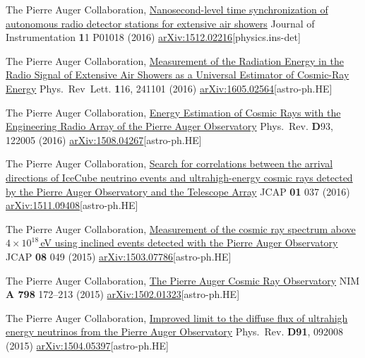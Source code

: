 \begin{etaremune}
\item {}The Pierre Auger Collaboration, \href{http://iopscience.iop.org/article/10.1088/1748-0221/11/01/P01018}{{Nanosecond-level time synchronization of autonomous radio detector stations for extensive air showers}} Journal of Instrumentation {\textbf 11} P01018 (2016) \href{http://arxiv.org/abs/1512.02216}{arXiv:1512.02216}[physics.ins-det]

\item {}The Pierre Auger Collaboration, \href{http://journals.aps.org/prl/abstract/10.1103/PhysRevLett.116.241101}{{Measurement of the Radiation Energy in the Radio Signal of Extensive Air Showers as a Universal Estimator of Cosmic-Ray Energy}} Phys.\ Rev\  Lett. {\textbf 116}, 241101 (2016) \href{http://arxiv.org/abs/1605.02564}{arXiv:1605.02564}[astro-ph.HE]

\item {}The Pierre Auger Collaboration, \href{http://journals.aps.org/prd/abstract/10.1103/PhysRevD.93.122005}{{Energy Estimation of Cosmic Rays with the Engineering Radio Array of the Pierre Auger Observatory}} Phys.\ Rev. {\textbf D93}, 122005 (2016) \href{http://arxiv.org/abs/1508.04267}{arXiv:1508.04267}[astro-ph.HE]

\item {}The Pierre Auger Collaboration, \href{http://dx.doi.org/10.1088/1475-7516/2016/01/037}{{Search for correlations between the arrival directions of IceCube neutrino events and ultrahigh-energy cosmic rays detected by the Pierre Auger Observatory and the Telescope Array}} JCAP {\textbf{01}} 037 (2016) \href{http://arxiv.org/abs/1511.09408}{arXiv:1511.09408}[astro-ph.HE]

\item {}The Pierre Auger Collaboration, \href{http://dx.doi.org/10.1088/1475-7516/2015/08/049}{{Measurement of the cosmic ray spectrum above $4\times 10^{18}$\,eV using inclined events detected with the Pierre Auger Observatory}} JCAP {\textbf{08}} 049 (2015) \href{http://arxiv.org/abs/1503.07786}{arXiv:1503.07786}[astro-ph.HE]

\item {}The Pierre Auger Collaboration, \href{http://dx.doi.org/10.1016/j.nima.2015.06.058}{{The Pierre Auger Cosmic Ray Observatory}} NIM {\textbf{A 798}} 172--213 (2015) \href{http://arxiv.org/abs/1502.01323}{arXiv:1502.01323}[astro-ph.HE]

\item {}The Pierre Auger Collaboration, \href{http://dx.doi.org/10.1103/PhysRevD.91.092008}{{Improved limit to the diffuse flux of ultrahigh energy neutrinos from the Pierre Auger Observatory}} Phys.\ Rev. {\textbf{D91}}, 092008 (2015) \href{http://arxiv.org/abs/1504.05397}{arXiv:1504.05397}[astro-ph.HE]


\end{etaremune}
